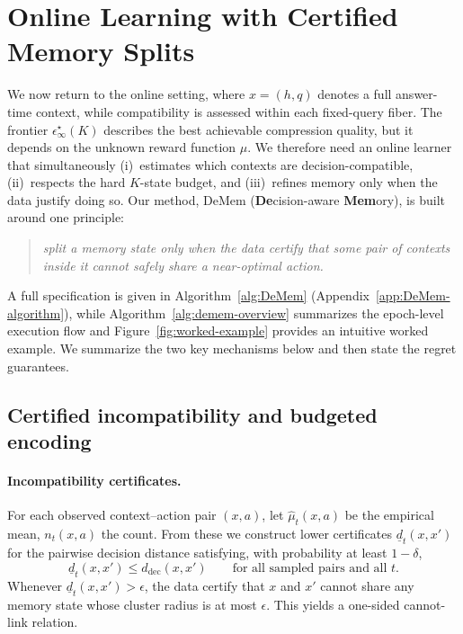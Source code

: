 \documentclass{article}
\theoremstyle{plain}
\theoremstyle{definition}
\theoremstyle{remark}
\newcommand{\eps}{\epsilon}
\begin{document}
\section{Online Learning with Certified Memory Splits}
\label{sec:algo}
\vspace{-0.5em}
We now return to the online setting, where \(x=(h,q)\) denotes a full
answer-time context, while compatibility is assessed within each fixed-query
fiber. The frontier $\eps^\star_\infty(K)$ describes the best achievable compression
quality, but it depends on the unknown reward function $\mu$.
We therefore need an online learner that simultaneously
(i)~estimates which contexts are decision-compatible,
(ii)~respects the hard $K$-state budget,
and (iii)~refines memory only when the data justify doing so.
Our method, DeMem (\textbf{De}cision-aware \textbf{Mem}ory), is built
around one principle:
\begin{quote}
\centering
\emph{split a memory state only when the data certify that some pair of
contexts inside it cannot safely share a near-optimal action.}
\end{quote}
A full specification is given in Algorithm~\ref{alg:DeMem}
(Appendix~\ref{app:DeMem-algorithm}), while
Algorithm~\ref{alg:demem-overview} summarizes the epoch-level
execution flow and Figure~\ref{fig:worked-example} provides an
intuitive worked example.
We summarize the two key mechanisms below and then state the regret guarantees.


\vspace{-0.3em}
\subsection{Certified incompatibility and budgeted encoding}
\label{sec:certificates}
\vspace{-0.3em}
\paragraph{Incompatibility certificates.}
For each observed context--action pair \((x,a)\), let \(\hat\mu_t(x,a)\) be the
empirical mean, \(n_t(x,a)\) the count. From these we construct lower certificates
\(\underline d_t(x,x')\) for the pairwise decision distance satisfying,
with probability at least \(1-\delta\),
\begin{equation}
\label{eq:ddec-lower}
\underline d_t(x,x') \le d_{\mathrm{dec}}(x,x')
\qquad
\text{for all sampled pairs and all } t .
\end{equation}
Whenever \(\underline d_t(x,x')>\eps\), the data certify that \(x\) and
\(x'\) cannot share any memory state whose cluster radius is at most \(\eps\).
This yields a one-sided cannot-link relation.
\end{document}
